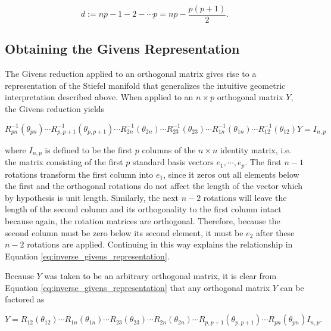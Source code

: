 \documentclass[ba]{imsart}
\numberwithin{equation}{section}
\theoremstyle{plain}
\begin{document}
\begin{equation}
\label{eq:stiefel_dimension}
d := np - 1 - 2- \cdots p  = np - \frac{p(p+1)}{2}.
\end{equation}

\subsection{Obtaining the Givens Representation}\label{givens_representation_introduction}
The Givens reduction applied to an orthogonal matrix gives rise to a representation of the Stiefel manifold that generalizes the intuitive geometric interpretation described above. When applied to an $n \times p$ orthogonal matrix $Y$, the Givens reduction yields 

\begin{equation}
\label{eq:inverse_givens_representation}
R_{pn}^{-1}(\theta_{pn}) \cdots R_{p,p+1}^{-1}(\theta_{p,p+1})  \cdots R_{2n}^{-1}(\theta_{2n}) \cdots R_{23}^{-1}(\theta_{23}) \cdots R_{1n}^{-1}(\theta_{1n}) \cdots R_{12}^{-1}(\theta_{12}) Y = I_{n,p}
\end{equation}

\noindent where $I_{n,p}$ is defined to be the first $p$ columns of the $n \times n$ identity matrix, i.e. the matrix consisting of the first $p$ standard basis vectors $e_1, \cdots, e_p$. The first $n-1$ rotations transform the first column into $e_1$, since it zeros out all elements below the first and the orthogonal rotations do not affect the length of the vector which by hypothesis is unit length. Similarly, the next $n-2$ rotations will leave the length of the second column and its orthogonality to the first column intact because again, the rotation matrices are orthogonal. Therefore, because the second column must be zero below its second element, it must be $e_2$ after these $n-2$ rotations are applied. Continuing in this way explains the relationship in Equation \ref{eq:inverse_givens_representation}.

\noindent Because $Y$ was taken to be an arbitrary orthogonal matrix, it is clear from Equation \ref{eq:inverse_givens_representation} that any orthogonal matrix $Y$ can be factored as

\begin{equation}
\label{eq:givens_representation}
Y = R_{12}(\theta_{12}) \cdots R_{1n}(\theta_{1n})  \cdots R_{23}(\theta_{23}) \cdots R_{2n}(\theta_{2n}) \cdots R_{p,p+1}(\theta_{p,p+1}) \cdots R_{pn}(\theta_{pn}) I_{n,p}.
\end{equation}
\end{document}
